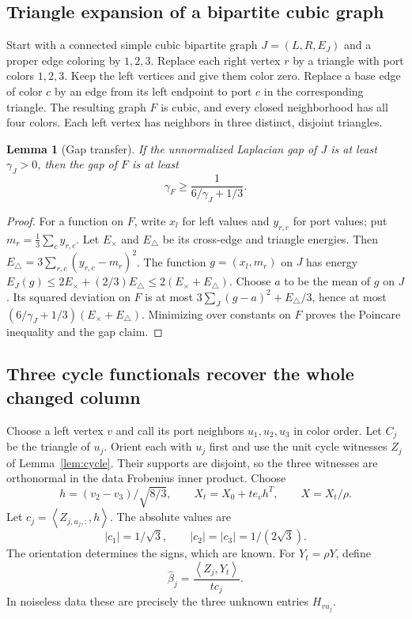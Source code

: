 \documentclass[11pt]{article}
\newtheorem{lemma}[theorem]{Lemma}
\theoremstyle{remark}\newtheorem{remark}[theorem]{Remark}
\newcommand{\ip}[2]{\left\langle #1,#2\right\rangle}
\begin{document}
\subsection{Triangle expansion of a bipartite cubic graph}

Start with a connected simple cubic bipartite graph $J=(L,R,E_J)$ and a proper edge coloring by $1,2,3$. Replace each right vertex $r$ by a triangle with port colors $1,2,3$. Keep the left vertices and give them color zero. Replace a base edge of color $c$ by an edge from its left endpoint to port $c$ in the corresponding triangle. The resulting graph $F$ is cubic, and every closed neighborhood has all four colors. Each left vertex has neighbors in three distinct, disjoint triangles.

\begin{lemma}[Gap transfer]\label{lem:gap}
If the unnormalized Laplacian gap of $J$ is at least $\gamma_J>0$, then the gap of $F$ is at least
\begin{equation}\label{eq:gaptransfer}
\gamma_F\geq\frac1{6/\gamma_J+1/3}.
\end{equation}
\end{lemma}

\begin{proof}
For a function on $F$, write $x_l$ for left values and $y_{r,c}$ for port values; put $m_r=\frac13\sum_cy_{r,c}$. Let $E_\times$ and $E_\triangle$ be its cross-edge and triangle energies. Then
$E_\triangle=3\sum_{r,c}(y_{r,c}-m_r)^2$. The function $g=(x_l,m_r)$ on $J$ has energy
$E_J(g)\leq2E_\times+(2/3)E_\triangle\leq2(E_\times+E_\triangle)$.
Choose $a$ to be the mean of $g$ on $J$. Its squared deviation on $F$ is at most
$3\sum_{J}(g-a)^2+E_\triangle/3$, hence at most
$(6/\gamma_J+1/3)(E_\times+E_\triangle)$. Minimizing over constants on $F$ proves the Poincare inequality and the gap claim.
\end{proof}

\subsection{Three cycle functionals recover the whole changed column}

Choose a left vertex $v$ and call its port neighbors $u_1,u_2,u_3$ in color order. Let $C_j$ be the triangle of $u_j$. Orient each with $u_j$ first and use the unit cycle witnesses $Z_j$ of Lemma~\ref{lem:cycle}. Their supports are disjoint, so the three witnesses are orthonormal in the data Frobenius inner product. Choose
\[
h=(v_2-v_3)/\sqrt{8/3},\qquad X_t=X_0+t e_vh^T,\qquad X=X_t/\rho.
\]
Let $c_j=\ip{Z_{j,u_j,:}}h$. The absolute values are
\begin{equation}\label{eq:pairings}
|c_1|=1/\sqrt3,\qquad |c_2|=|c_3|=1/(2\sqrt3).
\end{equation}
The orientation determines the signs, which are known. For $Y_t=\rho Y$, define
\begin{equation}\label{eq:beta}
\widehat\beta_j=\frac{\ip{Z_j}{Y_t}}{tc_j}.
\end{equation}
In noiseless data these are precisely the three unknown entries $H_{vu_j}$.
\end{document}
